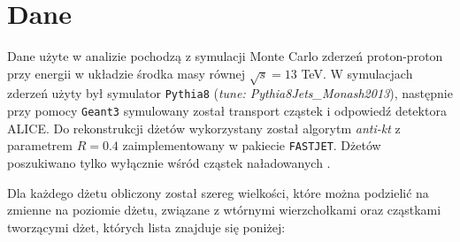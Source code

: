 \section{Dane}
\label{sec:dane}


Dane użyte w analizie pochodzą z symulacji Monte Carlo zderzeń proton-proton przy energii w układzie środka masy równej $\sqrt{s} = 13$ TeV. 
W symulacjach zderzeń użyty był symulator \texttt{Pythia8} (\textit{tune: Pythia8Jets\_Monash2013}), następnie przy pomocy \texttt{Geant3} symulowany został transport cząstek i odpowiedź detektora ALICE. 
Do rekonstrukcji dżetów wykorzystany został algorytm \textit{anti-kt} z parametrem $R = 0.4$ zaimplementowany w pakiecie \texttt{FASTJET}. Dżetów poszukiwano tylko wyłącznie wśród cząstek naładowanych .

Dla każdego dżetu obliczony został szereg wielkości, które można podzielić na zmienne na poziomie dżetu, związane z wtórnymi wierzchołkami oraz cząstkami tworzącymi dżet, których lista znajduje się poniżej:


